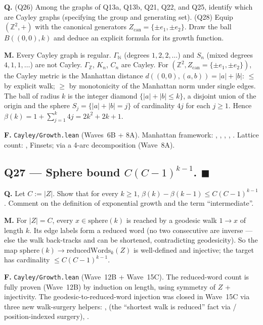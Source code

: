 \documentclass[11pt,a4paper]{article}
\newcommand{\done}[1]{\textcolor{donegreen}{\textbf{#1}}}
\newcommand{\lmod}[1]{\texttt{\small #1}}
\newcommand{\N}{\mathbb{N}}
\newcommand{\Z}{\mathbb{Z}}
\theoremstyle{plain}
\theoremstyle{definition}
\begin{document}
\textbf{Q.} (Q26) Among the graphs of Q13a, Q13b, Q21, Q22, and Q25,
identify which are Cayley graphs (specifying the group and
generating set). (Q28) Equip $(\Z^2, +)$ with the canonical
generators $Z_{\text{can}} = \{\pm e_1, \pm e_2\}$. Draw the ball
$B((0,0), k)$ and deduce an explicit formula for its growth function.

\textbf{M.} Every Cayley graph is regular. $\Gamma_\N$ (degrees
$1, 2, 2, \ldots$) and $S_n$ (mixed degrees $4, 1, 1, \ldots$) are
not Cayley. $\Gamma_\Z$, $K_n$, $C_n$ are Cayley. For $(\Z^2,
Z_{\text{can}} = \{\pm e_1, \pm e_2\})$, the Cayley metric is the
Manhattan distance $d((0,0), (a,b)) = |a| + |b|$: $\leq$ by
explicit walk; $\geq$ by monotonicity of the Manhattan norm under
single edges. The ball of radius $k$ is the integer diamond
$\{|a| + |b| \leq k\}$, a disjoint union of the origin and the
sphere $S_j = \{|a|+|b| = j\}$ of cardinality $4 j$ for each
$j \geq 1$. Hence $\beta(k) = 1 + \sum_{j=1}^k 4 j = 2 k^2 + 2 k + 1$.

\textbf{F.} \lmod{Cayley/Growth.lean} (Waves~6B + 8A).
Manhattan framework: , ,
, ,
. Lattice count:
,  Finsets;
 via a 4-arc decomposition (Wave~8A).

\subsection{Q27 --- Sphere bound $C(C-1)^{k-1}$. \done{$\blacksquare$}}

\textbf{Q.} Let $C := |Z|$. Show that for every $k \geq 1$,
$\beta(k) - \beta(k-1) \leq C(C-1)^{k-1}$. Comment on the definition
of exponential growth and the term ``intermediate''.

\textbf{M.} For $|Z| = C$, every $x \in \text{sphere}(k)$ is
reached by a geodesic walk $1 \to x$ of length $k$. Its edge
labels form a reduced word (no two consecutive are inverse ---
else the walk back-tracks and can be shortened, contradicting
geodesicity). So the map $\text{sphere}(k) \to \text{reducedWords}_k(Z)$
is well-defined and injective; the target has cardinality
$\leq C(C-1)^{k-1}$.

\textbf{F.} \lmod{Cayley/Growth.lean} (Wave~12B + Wave~15C).
The reduced-word count 
is fully proven (Wave~12B) by induction on length, using
symmetry of $Z$ +  injectivity. The
geodesic-to-reduced-word injection
 was closed in
Wave~15C via three new walk-surgery helpers:
,
 (the ``shortest walk is
reduced'' fact via /
position-indexed surgery),
.
\end{document}
